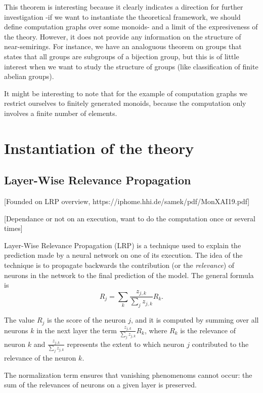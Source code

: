 \documentclass[11pt,a4paper]{article}
\begin{document}
	This theorem is interesting because it clearly indicates a direction for further investigation -if we want to instantiate the theoretical framework, we should define computation graphs over some monoids- and a limit of the expresiveness of the theory. However, it does not provide any information on the structure of near-semirings. For instance, we have an analoguous theorem on groups that states that all groups are subgroups of a bijection group, but this is of little interest when we want to study the structure of groups (like classification of finite abelian groups).


It might be interesting to note that for the example of computation graphs we restrict ourselves to finitely generated monoids, because the computation only involves a finite number of elements.

\section{Instantiation of the theory}

	\subsection{Layer-Wise Relevance Propagation}
	
		[Founded on LRP overview, https://iphome.hhi.de/samek/pdf/MonXAI19.pdf]
		
		[Dependance or not on an execution, want to do the computation once or several times]
		
	Layer-Wise Relevance Propagation (LRP) is a technique used to explain the prediction made by a neural network on one of its execution. The idea of the technique is to propagate backwards the contribution (or the \textit{relevance}) of neurons in the network to the final prediction of the model. The general formula is 
		$$ R_j = \underset{k}{\sum} \frac{z_{j,k}}{\sum_j z_{j,k}} R_k .$$
		
	The value $R_j$ is the score of the neuron $j$, and it is computed by summing over all neurons $k$ in the next layer the term $\frac{z_{j,k}}{\sum_j z_{j,k}} R_k$, where $R_k$ is the relevance of neuron $k$ and $\frac{z_{j,k}}{\sum_j z_{j,k}}$ represents the extent to which neuron $j$ contributed to the relevance of the neuron $k$.
		
	The normalization term ensures that vanishing phenomenoms cannot occur: the sum of the relevances of neurons on a given layer is preserved.
		\\
		
\end{document}
